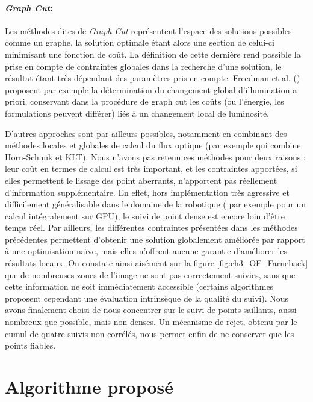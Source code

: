 \paragraph{\emph{Graph Cut}:\\}
Les méthodes dites de \emph{Graph Cut} représentent l'espace des solutions possibles comme un graphe, la solution optimale étant alors une section de celui-ci minimisant une fonction de coût. La définition de cette dernière rend possible la prise en compte de contraintes globales dans la recherche d'une solution, le résultat étant très dépendant des paramètres pris en compte. Freedman et al. (\cite{Freedman}) proposent par exemple la détermination du changement global d'illumination a priori, conservant dans la procédure de \og graph cut\fg{} les coûts (ou l'énergie, les formulations peuvent différer) liés à un changement local de luminosité.

D'autres approches sont par ailleurs possibles, notamment en combinant des méthodes locales et globales de calcul du flux optique (par exemple \cite{Bruhn2005} qui combine Horn-Schunk et KLT). Nous n'avons pas retenu ces méthodes pour deux raisons : leur coût en termes de calcul est très important, et les contraintes apportées, si elles permettent le lissage des point aberrants, n'apportent pas réellement d'information supplémentaire. En effet, hors implémentation très agressive et difficilement généralisable dans le domaine de la robotique (\cite{Dumortier} par exemple pour un calcul intégralement sur GPU), le suivi de point dense est encore loin d'être temps réel. Par ailleurs, les différentes contraintes présentées dans les méthodes précédentes permettent d'obtenir une solution globalement améliorée par rapport à une optimisation naïve, mais elles n'offrent aucune garantie d'améliorer les résultats locaux. On constate ainsi aisément sur la figure \ref{fig:ch3_OF_Farneback} que de nombreuses zones de l'image ne sont pas correctement suivies, sans que cette information ne soit immédiatement accessible (certains algorithmes proposent cependant une évaluation intrinsèque de la qualité du suivi). Nous avons finalement choisi de nous concentrer sur le suivi de points saillants, aussi nombreux que possible, mais non denses. Un mécanisme de rejet, obtenu par le cumul de quatre suivis non-corrélés, nous permet enfin de ne conserver que les points fiables.

\section{Algorithme proposé} \label{sec:ch3_Vision_mécanisme}
